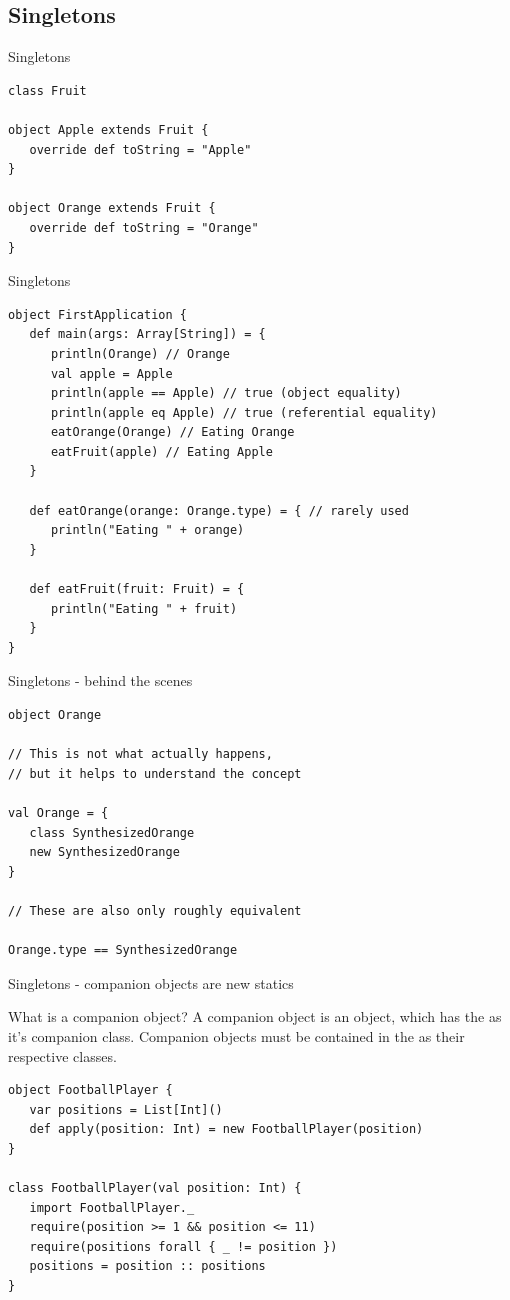 \subsection{Singletons}
\begin{frame}[fragile]{Singletons}
\begin{lstlisting}
class Fruit

object Apple extends Fruit {
   override def toString = "Apple"
}

object Orange extends Fruit {
   override def toString = "Orange"
}
\end{lstlisting}
\end{frame}

\begin{frame}[fragile]{Singletons}
\begin{lstlisting}
object FirstApplication {
   def main(args: Array[String]) = {
      println(Orange) // Orange
      val apple = Apple
      println(apple == Apple) // true (object equality)
      println(apple eq Apple) // true (referential equality)
      eatOrange(Orange) // Eating Orange
      eatFruit(apple) // Eating Apple
   }
   
   def eatOrange(orange: Orange.type) = { // rarely used
      println("Eating " + orange)
   }
   
   def eatFruit(fruit: Fruit) = {
      println("Eating " + fruit)
   }
}
\end{lstlisting}
\end{frame}

\begin{frame}[fragile]{Singletons - behind the scenes}
\begin{lstlisting}
object Orange

// This is not what actually happens,
// but it helps to understand the concept

val Orange = {
   class SynthesizedOrange
   new SynthesizedOrange
}

// These are also only roughly equivalent

Orange.type == SynthesizedOrange
\end{lstlisting}

\end{frame}

\begin{frame}[fragile]{Singletons - companion objects are new statics}
\begin{block}{What is a companion object?}
A companion object is an object, which has the  as it's
companion class. Companion objects \alert{must} be contained in the
 as their respective classes.
\end{block}
\pause
\begin{lstlisting}
object FootballPlayer {
   var positions = List[Int]()
   def apply(position: Int) = new FootballPlayer(position)
}

class FootballPlayer(val position: Int) {
   import FootballPlayer._
   require(position >= 1 && position <= 11)
   require(positions forall { _ != position })
   positions = position :: positions
}
\end{lstlisting}
\end{frame}

